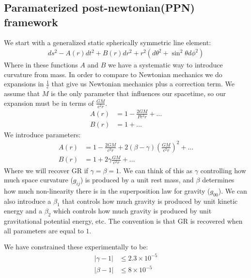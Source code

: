 \subsection{Paramaterized post-newtonian(PPN) framework}
We start with a generalized static spherically symmetric line element:
\begin{align*}
	ds^2 -A(r)dt^2 + B(r) dr^2 + r^2(d\theta^2 + \sin^2\theta d\phi^2)
\end{align*}
Where in these functions $A$ and $B$ we have a systematic way to introduce curvature from mass. In order to compare to Newtonian mechanics we do expansions in $\frac{1}{c}$ that give us Newtonian mechanics plus a correction term.
We assume that $M$ is the only parameter that influences our spacetime, so our expansion must be in terms of $\frac{GM}{c^2 r}$.
\begin{align*}
	A(r) &= 1 - \frac{2GM}{Pc^2 r} + \ldots \\
	B(r) &= 1 + \ldots
\end{align*}
We introduce parameters:
\begin{align*}
	A(r) &= 1 - \frac{2GM}{c^2 r} + 2(\beta - \gamma)\left(\frac{GM}{c^2 r}\right)^2  + \ldots \\
	B(r) &= 1 + 2\gamma \frac{GM}{c^2 r} + \ldots
\end{align*}
Where we will recover GR if $\gamma = \beta = 1$. We can think of this as $\gamma$ controlling how much space curvature ($g_{ij}$) is produced by a unit rest mass, and $\beta$ determines how much non-linearity there is in the superposition law for gravity ($g_{00}$).
We can also introduce a $\beta_1$ that controls how much gravity is produced by unit kinetic energy and a $\beta_2$ which controls how much gravity is produced by unit gravitational potential energy, etc.
The convention is that GR is recovered when all parameters are equal to $1$.

We have constrained these experimentally to be:
\begin{align*}
	|\gamma-1| &\leq 2.3\times 10^{-5} \\
	|\beta - 1| &\leq 8\times 10^{-5}
\end{align*}
